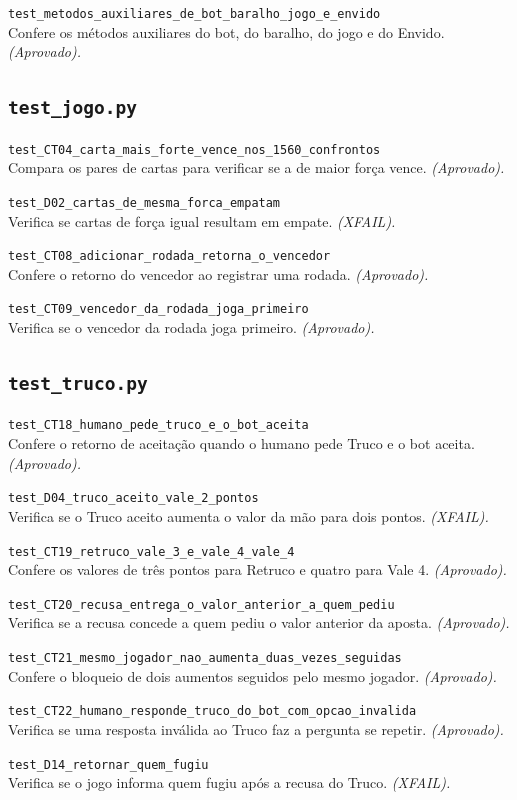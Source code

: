 \documentclass[11pt,a4paper]{article}
\newcommand{\teste}[3]{\par\noindent\begin{minipage}{\textwidth}\texttt{#1}\\#2 \emph{(#3).}\end{minipage}\par\vspace{0.15em}}
\begin{document}
\teste{test\_metodos\_auxiliares\_de\_bot\_baralho\_jogo\_e\_envido}{Confere os métodos auxiliares do bot, do baralho, do jogo e do Envido.}{Aprovado}
\subsection*{\texttt{\textbf{test\_jogo.py}}}
\teste{test\_CT04\_carta\_mais\_forte\_vence\_nos\_1560\_confrontos}{Compara os pares de cartas para verificar se a de maior força vence.}{Aprovado}
\teste{test\_D02\_cartas\_de\_mesma\_forca\_empatam}{Verifica se cartas de força igual resultam em empate.}{XFAIL}
\teste{test\_CT08\_adicionar\_rodada\_retorna\_o\_vencedor}{Confere o retorno do vencedor ao registrar uma rodada.}{Aprovado}
\teste{test\_CT09\_vencedor\_da\_rodada\_joga\_primeiro}{Verifica se o vencedor da rodada joga primeiro.}{Aprovado}
\subsection*{\texttt{\textbf{test\_truco.py}}}
\teste{test\_CT18\_humano\_pede\_truco\_e\_o\_bot\_aceita}{Confere o retorno de aceitação quando o humano pede Truco e o bot aceita.}{Aprovado}
\teste{test\_D04\_truco\_aceito\_vale\_2\_pontos}{Verifica se o Truco aceito aumenta o valor da mão para dois pontos.}{XFAIL}
\teste{test\_CT19\_retruco\_vale\_3\_e\_vale\_4\_vale\_4}{Confere os valores de três pontos para Retruco e quatro para Vale 4.}{Aprovado}
\teste{test\_CT20\_recusa\_entrega\_o\_valor\_anterior\_a\_quem\_pediu}{Verifica se a recusa concede a quem pediu o valor anterior da aposta.}{Aprovado}
\teste{test\_CT21\_mesmo\_jogador\_nao\_aumenta\_duas\_vezes\_seguidas}{Confere o bloqueio de dois aumentos seguidos pelo mesmo jogador.}{Aprovado}
\teste{test\_CT22\_humano\_responde\_truco\_do\_bot\_com\_opcao\_invalida}{Verifica se uma resposta inválida ao Truco faz a pergunta se repetir.}{Aprovado}
\teste{test\_D14\_retornar\_quem\_fugiu}{Verifica se o jogo informa quem fugiu após a recusa do Truco.}{XFAIL}
\end{document}
